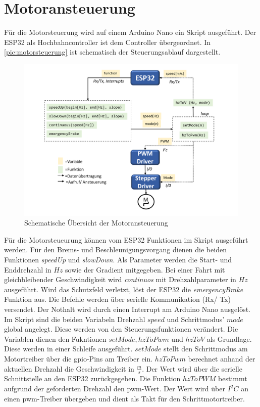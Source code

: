 \section{Motoransteuerung}
Für die Motorsteuerung wird auf einem Arduino Nano ein Skript ausgeführt. Der ESP32 als Hochbahncontroller ist dem Controller übergeordnet. In \autoref{pic:motorsteuerung} ist schematisch der Steuerungsablauf  dargestellt. 
\begin{figure}[h]
	\begin{center}
		\includegraphics[width=17cm]{motorsteuerung.pdf}
		\caption{Schematische Übersicht der Motoransteuerung}
		\label{pic:motorsteuerung}
	\end{center}
\end{figure}

\newpage

Für die Motorsteueurung können vom ESP32 Funktionen im Skript ausgeführt werden. Für den Brems- und Beschleunigungsvorgang dienen die beiden Funktionen \textit{ speedUp} und \textit{slowDown}. Als Parameter werden die Start- und Enddrehzahl in $Hz$ sowie der Gradient mitgegeben. Bei einer Fahrt mit gleichbleibender Geschwindigkeit wird \textit{continuos} mit Drehzahlparameter in $Hz$ ausgeführt. Wird das Schutzfeld verletzt, löst der ESP32 die \textit{emergencyBrake} Funktion aus. Die Befehle werden über serielle Kommunikation (Rx/ Tx) versendet. Der Nothalt wird durch einen Interrupt am Arduino Nano ausgelöst. \\

Im Skript sind die beiden Variabeln Drehzahl $speed$ und Schrittmodus' $mode$ global angelegt. Diese werden von den Steuerungsfunktionen verändert. Die Variablen dienen den Fukntionen $setMode, hzToPwm$ und $hzToV$ als Grundlage. Diese werden in einer Schleife ausgeführt. $setMode$ stellt den Schrittmodus am Motortreiber über die \acrshort{gpio}-Pins am  Treiber ein. $hzToPwm$ berechnet anhand der aktuellen Drehzahl die Geschwindigkeit in $\frac{m}{s}$. Der Wert wird über die serielle Schnittstelle an den ESP32 zurückgegeben. Die Funktion $hzToPWM$ bestimmt aufgrund der geforderten Drehzahl den \acrshort{pwm}-Wert. Der Wert wird über $I^2C$ an einen  \acrshort{pwm}-Treiber übergeben und dient als Takt für den Schrittmotortreiber. \\

